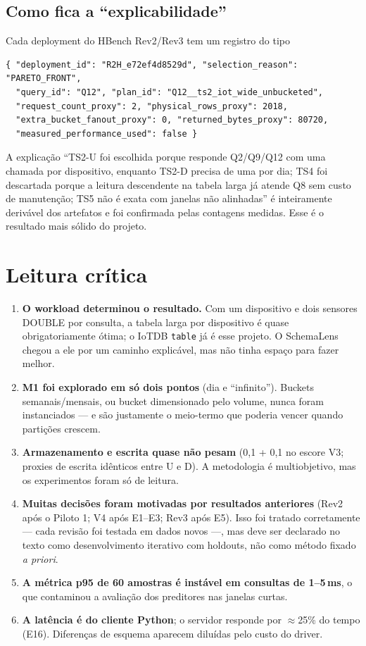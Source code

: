 \documentclass[11pt,a4paper]{article}
\begin{document}
\subsection{Como fica a ``explicabilidade''}
Cada deployment do HBench Rev2/Rev3 tem um registro do tipo
\begin{lstlisting}
{ "deployment_id": "R2H_e72ef4d8529d", "selection_reason": "PARETO_FRONT",
  "query_id": "Q12", "plan_id": "Q12__ts2_iot_wide_unbucketed",
  "request_count_proxy": 2, "physical_rows_proxy": 2018,
  "extra_bucket_fanout_proxy": 0, "returned_bytes_proxy": 80720,
  "measured_performance_used": false }
\end{lstlisting}
A explicação ``TS2-U foi escolhida porque responde Q2/Q9/Q12 com uma chamada por dispositivo, enquanto TS2-D precisa de uma por dia; TS4 foi descartada porque a leitura descendente na tabela larga já atende Q8 sem custo de manutenção; TS5 não é exata com janelas não alinhadas'' é inteiramente derivável dos artefatos e foi confirmada pelas contagens medidas. Esse é o resultado mais sólido do projeto.

\section{Leitura crítica}
\begin{enumerate}
\item \textbf{O workload determinou o resultado.} Com um dispositivo e dois sensores DOUBLE por consulta, a tabela larga por dispositivo é quase obrigatoriamente ótima; o IoTDB \texttt{table} já é esse projeto. O SchemaLens chegou a ele por um caminho explicável, mas não tinha espaço para fazer melhor.
\item \textbf{M1 foi explorado em só dois pontos} (dia e ``infinito''). Buckets semanais/mensais, ou bucket dimensionado pelo volume, nunca foram instanciados --- e são justamente o meio-termo que poderia vencer quando partições crescem.
\item \textbf{Armazenamento e escrita quase não pesam} (0,1 + 0,1 no escore V3; proxies de escrita idênticos entre U e D). A metodologia é multiobjetivo, mas os experimentos foram só de leitura.
\item \textbf{Muitas decisões foram motivadas por resultados anteriores} (Rev2 após o Piloto 1; V4 após E1--E3; Rev3 após E5). Isso foi tratado corretamente --- cada revisão foi testada em dados novos ---, mas deve ser declarado no texto como desenvolvimento iterativo com holdouts, não como método fixado \emph{a priori}.
\item \textbf{A métrica p95 de 60 amostras é instável em consultas de 1--5\,ms}, o que contaminou a avaliação dos preditores nas janelas curtas.
\item \textbf{A latência é do cliente Python}; o servidor responde por $\approx$25\% do tempo (E16). Diferenças de esquema aparecem diluídas pelo custo do driver.
\end{enumerate}
\end{document}
